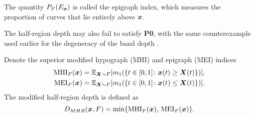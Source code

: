 The quantity $P_F(E_{\bm{x}})$ is called the epigraph index, which measures the
proportion of curves that lie entirely above $\bm{x}$.

\begin{remark}
    The half-region depth may also fail to satisfy \textbf{P0}, with the same
    counterexample used earlier for the degeneracy of the band depth
    \parencite[Theorem~3.2]{chakraborty-chaudhuri-2014a}.
\end{remark}

\begin{definition}
    Denote the superior modified hypograph (MHI) and epigraph (MEI) indices
    \begin{align}
        \operatorname{MHI}_F(\bm{x}) &= \operatorname{\mathbb{E}}_{\bm{X} \sim F}[m_1(\{t \in [0, 1]\colon \bm{x}(t) \geq \bm{X}(t)\})], \\
        \operatorname{MEI}_F(\bm{x}) &= \operatorname{\mathbb{E}}_{\bm{X} \sim F}[m_1(\{t \in [0, 1]\colon \bm{x}(t) \leq \bm{X}(t)\})].
    \end{align}
    The modified half-region depth is defined as
    \begin{equation}
        D_{MHR}(\bm{x}, F) = \min\{\operatorname{MHI}_F(\bm{x}),\, \operatorname{MEI}_F(\bm{x})\}.
    \end{equation}
\end{definition}
